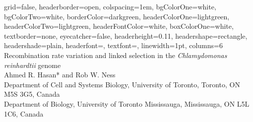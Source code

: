 \documentclass[a0paper,portrait]{baposter}
\begin{document}

\begin{poster}
{
grid=false,
headerborder=open, %
colspacing=1em, %
bgColorOne=white, %
bgColorTwo=white, %
borderColor=darkgreen, %
headerColorOne=lightgreen, %
headerColorTwo=lightgreen, %
headerFontColor=white, %
boxColorOne=white, %
textborder=none, %
eyecatcher=false, %
headerheight=0.11\textheight, %
headershape=rectangle, %
headershade=plain,
headerfont=\Large\textsf, %
textfont=\textsf, %
linewidth=1pt, %
columns=6 %
}
{}
%
%
{
\vspace{0.3em}
\textsf %
{Recombination rate variation and linked selection in the \textit{Chlamydomonas reinhardtii} genome
}
} %
{\sf\vspace{0em}\\
Ahmed R. Hasan* and Rob W. Ness
\vspace{0.1em}\\
\small{Department of Cell and Systems Biology, University of Toronto, Toronto, ON M5S 3G5, Canada \\ Department of Biology, University of Toronto Mississauga, Mississauga, ON L5L 1C6, Canada
}}
\end{poster}
\end{document}
